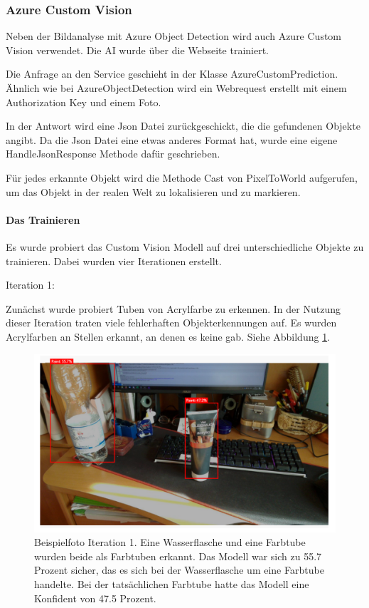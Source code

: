 \subsubsection{Azure Custom Vision}

Neben der Bildanalyse mit Azure Object Detection wird auch Azure Custom Vision verwendet.
Die AI wurde über die Webseite trainiert.

Die Anfrage an den Service geschieht in der Klasse AzureCustomPrediction. Ähnlich wie bei AzureObjectDetection wird ein Webrequest erstellt mit einem Authorization Key und einem Foto.

In der Antwort wird eine Json Datei zurückgeschickt, die die gefundenen Objekte angibt.
Da die Json Datei eine etwas anderes Format hat, wurde eine eigene HandleJsonResponse Methode dafür geschrieben.

Für jedes erkannte Objekt wird die Methode Cast von PixelToWorld aufgerufen, um das Objekt in der realen Welt zu lokalisieren und zu markieren.

\paragraph{Das Trainieren}

Es wurde probiert das Custom Vision Modell auf drei unterschiedliche Objekte zu trainieren.
Dabei wurden vier Iterationen erstellt. 

Iteration 1:

Zunächst wurde probiert Tuben von Acrylfarbe zu erkennen. In der Nutzung dieser Iteration traten viele fehlerhaften Objekterkennungen auf. Es wurden Acrylfarben an Stellen erkannt, an denen es keine gab. Siehe Abbildung \ref{image:customVisionPaint}. 

\begin{figure}[H]
	\centering
	\includegraphics[width=1.0\textwidth]{images/customVisionPaint.PNG}
	\caption[]{Beispielfoto Iteration 1. Eine Wasserflasche und eine Farbtube wurden beide als Farbtuben erkannt. Das Modell war sich zu 55.7 Prozent sicher, das es sich bei der Wasserflasche um eine Farbtube handelte. Bei der tatsächlichen Farbtube hatte das Modell eine Konfident von 47.5 Prozent.}
	\label{image:customVisionPaint}
\end{figure}

